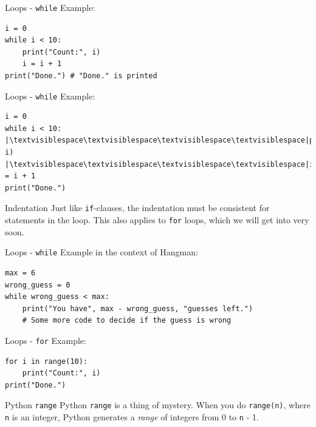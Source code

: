 \documentclass[dvipsnames, svgnames, x11names, handout]{beamer}
\begin{document}
\addtocounter{framenumber}{-1}

\begin{frame}[fragile]{Loops - \texttt{while}}
Example:
\begin{verbatim}
i = 0
while i < 10:
    print("Count:", i)
    i = i + 1
print("Done.") # "Done." is printed
\end{verbatim}
\end{frame}

\begin{frame}[fragile]{Loops - \texttt{while}}
Example:
\begin{verbatim}
i = 0
while i < 10:
|\textvisiblespace\textvisiblespace\textvisiblespace\textvisiblespace|print("Count:", i)
|\textvisiblespace\textvisiblespace\textvisiblespace\textvisiblespace|i = i + 1
print("Done.")
\end{verbatim}
\begin{block}{Indentation}
Just like \texttt{if}-clauses, the indentation must be consistent for statements in the loop.
This also applies to \texttt{for} loops, which we will get into very soon.
\end{block}
\end{frame}

\begin{frame}[fragile]{Loops - \texttt{while}}
Example in the context of Hangman:
\begin{verbatim}
max = 6
wrong_guess = 0
while wrong_guess < max:
    print("You have", max - wrong_guess, "guesses left.")
    # Some more code to decide if the guess is wrong
\end{verbatim}
\end{frame}

\begin{frame}[fragile]{Loops - \texttt{for}}
Example:
\begin{verbatim}
for i in range(10):
    print("Count:", i)
print("Done.")
\end{verbatim}
\begin{block}{Python \texttt{range}}
Python \texttt{range} is a thing of mystery. When you do \texttt{range(n)}, where \texttt{n} is an integer, Python generates a \textit{range} of integers from 0 to \texttt{n} - 1.
\end{block}
\end{frame}
\end{document}
